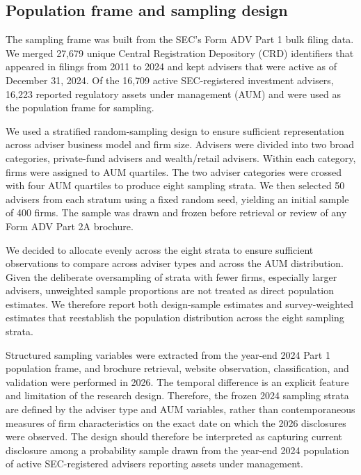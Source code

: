 \documentclass[utf8]{FrontiersinHarvard}
\begin{document}
\subsection{Population frame and sampling design}

The sampling frame was built from the SEC's Form ADV Part 1 bulk filing data. We merged 27{,}679 unique Central Registration Depository (CRD) identifiers that appeared in filings from 2011 to 2024 and kept advisers that were active as of December 31, 2024. Of the 16{,}709 active SEC-registered investment advisers, 16{,}223 reported regulatory assets under management (AUM) and were used as the population frame for sampling.

We used a stratified random-sampling design to ensure sufficient representation across adviser business model and firm size. Advisers were divided into two broad categories, private-fund advisers and wealth/retail advisers. Within each category, firms were assigned to AUM quartiles. The two adviser categories were crossed with four AUM quartiles to produce eight sampling strata. We then selected 50 advisers from each stratum using a fixed random seed, yielding an initial sample of 400 firms. The sample was drawn and frozen before retrieval or review of any Form ADV Part 2A brochure.

We decided to allocate evenly across the eight strata to ensure sufficient observations to compare across adviser types and across the AUM distribution. Given the deliberate oversampling of strata with fewer firms, especially larger advisers, unweighted sample proportions are not treated as direct population estimates. We therefore report both design-sample estimates and survey-weighted estimates that reestablish the population distribution across the eight sampling strata.

Structured sampling variables were extracted from the year-end 2024 Part 1 population frame, and brochure retrieval, website observation, classification, and validation were performed in 2026. The temporal difference is an explicit feature and limitation of the research design. Therefore, the frozen 2024 sampling strata are defined by the adviser type and AUM variables, rather than contemporaneous measures of firm characteristics on the exact date on which the 2026 disclosures were observed. The design should therefore be interpreted as capturing current disclosure among a probability sample drawn from the year-end 2024 population of active SEC-registered advisers reporting assets under management.
\end{document}
